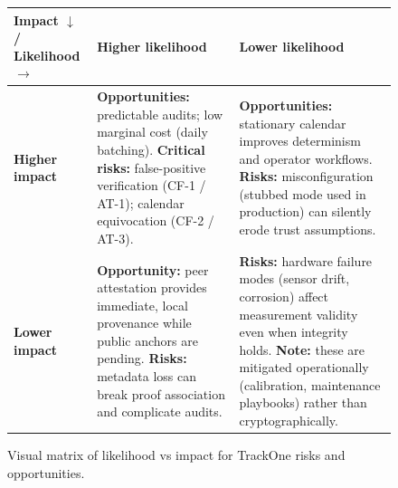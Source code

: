 \begin{figure}[H]
\centering
\small
\renewcommand{\arraystretch}{1.25}
\begin{tabularx}{0.97\linewidth}{>{\raggedright\arraybackslash}p{2.6cm} X X}
  \toprule
  \textbf{Impact $\downarrow$ / Likelihood $\rightarrow$} & \textbf{Higher likelihood} & \textbf{Lower likelihood} \\
  \midrule
  \textbf{Higher impact} &
  \textbf{Opportunities:} predictable audits; low marginal cost (daily batching).\newline
  \textbf{Critical risks:} false-positive verification (CF-1 / AT-1); calendar equivocation (CF-2 / AT-3). &
  \textbf{Opportunities:} stationary calendar improves determinism and operator workflows.\newline
  \textbf{Risks:} misconfiguration (stubbed mode used in production) can silently erode trust assumptions. \\
  \addlinespace
  \textbf{Lower impact} &
  \textbf{Opportunity:} peer attestation provides immediate, local provenance while public anchors are pending.\newline
  \textbf{Risks:} metadata loss can break proof association and complicate audits. &
  \textbf{Risks:} hardware failure modes (sensor drift, corrosion) affect measurement validity even when integrity holds.\newline
  \textbf{Note:} these are mitigated operationally (calibration, maintenance playbooks) rather than cryptographically. \\
  \bottomrule
\end{tabularx}
\normalsize
\caption{Visual matrix of likelihood vs impact for TrackOne risks and opportunities.}
\label{fig:risk-opportunity-matrix}
\end{figure}


